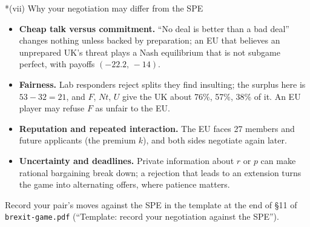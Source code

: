 \documentclass[10pt,a4paper]{article}
\makeatletter
\renewcommand\section{\@startsection{section}{1}{\z@}{6pt plus 2pt}{2pt}{\normalfont\large\bfseries}}
\newcommand{\Nt}{\mathit{Nt}}
\newcommand{\dF}{\mathit{F}}
\newcommand{\dU}{\mathit{U}}
\makeatother
\begin{document}
\section*{(vii) Why your negotiation may differ from the SPE}
\begin{itemize}[leftmargin=1.4em]
  \item \textbf{Cheap talk versus commitment.} ``No deal is better than a bad deal'' changes nothing
    unless backed by preparation; an EU that believes an unprepared UK's threat plays a Nash
    equilibrium that is not subgame perfect, with payoffs $(-22.2,\,-14)$.
  \item \textbf{Fairness.} Lab responders reject splits they find insulting; the surplus here is
    $53-32=21$, and $\dF$, $\Nt$, $\dU$ give the UK about 76\%, 57\%, 38\% of it. An EU player may
    refuse $\dF$ as unfair to the EU.
  \item \textbf{Reputation and repeated interaction.} The EU faces 27 members and future
    applicants (the premium $k$), and both sides negotiate again later.
  \item \textbf{Uncertainty and deadlines.} Private information about $r$ or $p$ can make rational
    bargaining break down; a rejection that leads to an extension turns the game into alternating
    offers, where patience matters.
\end{itemize}
Record your pair's moves against the SPE in the template at the end of \S11 of
\texttt{brexit-game.pdf} (``Template: record your negotiation against the SPE'').
\end{document}
